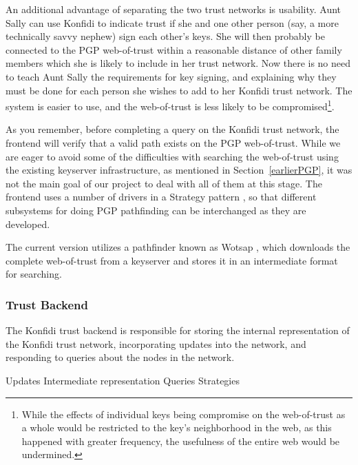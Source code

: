 \documentclass[onecolumn]{acm_proc_article-sp}
\begin{document}
An additional advantage of separating the two trust networks is usability.  Aunt Sally can use Konfidi to indicate trust if she and one other person (say, a more technically savvy nephew) sign each other's keys.  She will then probably be connected to the PGP web-of-trust within a reasonable distance of other family members which she is likely to include in her trust network.  Now there is no need to teach Aunt Sally the requirements for key signing, and explaining why they must be done for each person she wishes to add to her Konfidi trust network.  The system is easier to use, and the web-of-trust is less likely to be compromised\footnote{While the effects of individual keys being compromise on the web-of-trust as a whole would be restricted to the key's neighborhood in the web, as this happened with greater frequency, the usefulness of the entire web would be undermined.}.

As you remember, before completing a query on the Konfidi trust network, the frontend will verify that a valid path exists on the PGP web-of-trust.  While we are eager to avoid some of the difficulties with searching the web-of-trust using the existing keyserver infrastructure, as mentioned in Section~\ref{earlierPGP}, it was not the main goal of our project to deal with all of them at this stage.  The frontend uses a number of drivers in a Strategy pattern \cite{designPatterns}, so that different subsystems for doing PGP pathfinding can be interchanged as they are developed.

The current version utilizes a pathfinder known as Wotsap \cite{wotsap}, which downloads the complete web-of-trust from a keyserver and stores it in an intermediate format for searching.

\subsubsection{Trust Backend}
The Konfidi trust backend is responsible for storing the internal representation of the Konfidi trust network, incorporating updates into the network, and responding to queries about the nodes in the network.

Updates
Intermediate representation
Queries
Strategies
\end{document}
